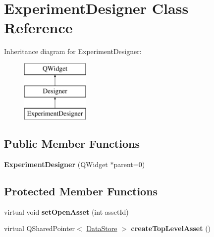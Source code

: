 \hypertarget{class_experiment_designer}{\section{Experiment\-Designer Class Reference}
\label{class_experiment_designer}
}
Inheritance diagram for Experiment\-Designer\-:\begin{figure}[H]
\begin{center}
\leavevmode
\includegraphics[height=3.000000cm]{class_experiment_designer}
\end{center}
\end{figure}
\subsection*{Public Member Functions}
\begin{DoxyCompactItemize}
\item 
\hypertarget{class_experiment_designer_ac709cce7a644c34520790ea5abe32b64}{{\bfseries Experiment\-Designer} (Q\-Widget $\ast$parent=0)}\label{class_experiment_designer_ac709cce7a644c34520790ea5abe32b64}

\end{DoxyCompactItemize}
\subsection*{Protected Member Functions}
\begin{DoxyCompactItemize}
\item 
\hypertarget{class_experiment_designer_a338a98a8d5cbd1d7ca34c2db314b4c70}{virtual void {\bfseries set\-Open\-Asset} (int asset\-Id)}\label{class_experiment_designer_a338a98a8d5cbd1d7ca34c2db314b4c70}

\item 
\hypertarget{class_experiment_designer_a62805cd25bbbe4ba6ae8cfeeff8c01df}{virtual Q\-Shared\-Pointer$<$ \hyperlink{class_picto_1_1_data_store}{Data\-Store} $>$ {\bfseries create\-Top\-Level\-Asset} ()}\label{class_experiment_designer_a62805cd25bbbe4ba6ae8cfeeff8c01df}

\end{DoxyCompactItemize}


